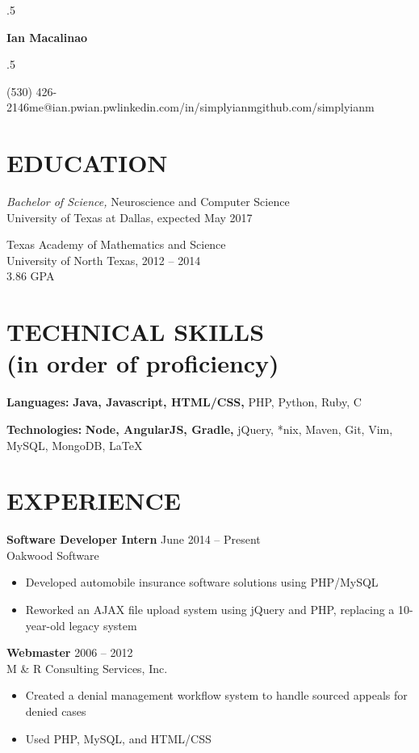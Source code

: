 \documentclass[margin, 10pt]{res} %
\newcommand*{\its}{\hspace{0.8cm}}
\begin{document}
\moveleft.5\hoffset\centerline{\Huge\bf Ian Macalinao}
\bigskip
\moveleft.5\hoffset\centerline{(530) 426-2146\its{}me@ian.pw\its{}ian.pw\its{}linkedin.com/in/simplyianm\its{}github.com/simplyianm}

\begin{resume}

  \section{EDUCATION}

  {\sl Bachelor of Science,} Neuroscience and Computer Science \\
  University of Texas at Dallas, expected May 2017
  \medskip

  Texas Academy of Mathematics and Science \\
  University of North Texas, 2012 -- 2014 \\
  3.86 GPA

  \section{TECHNICAL SKILLS \\ \textnormal{(in order of proficiency)}} 

  {\bf Languages:} \textbf{Java, Javascript, HTML/CSS,} \textmd{PHP, Python, Ruby,} \textnormal{C}

  {\bf Technologies:} \textbf{Node, AngularJS, Gradle,} \textmd{jQuery, *nix, Maven, Git, Vim,} \textnormal{MySQL, MongoDB, LaTeX}

  \section{EXPERIENCE}

  {\bf Software Developer Intern} \hfill June 2014 -- Present \\
  Oakwood Software

  \begin{itemize} \itemsep -2pt
    \item Developed automobile insurance software solutions using PHP/MySQL
    \item Reworked an AJAX file upload system using jQuery and PHP, replacing a 10-year-old legacy system
  \end{itemize}

  {\bf Webmaster} \hfill 2006 -- 2012 \\
  M \& R Consulting Services, Inc.
  \begin{itemize} \itemsep -2pt
    \item Created a denial management workflow system to handle sourced appeals for denied cases
    \item Used PHP, MySQL, and HTML/CSS
  \end{itemize} 


\end{resume}
\end{document}
